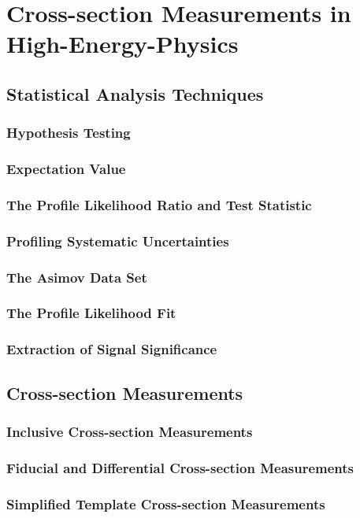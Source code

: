 \chapter{Cross-section Measurements in High-Energy-Physics}
\label{chap:statistics}

\section{Statistical Analysis Techniques}
\subsection{Hypothesis Testing}
\subsection{Expectation Value}
\subsection{The Profile Likelihood Ratio and Test Statistic}
\subsection{Profiling Systematic Uncertainties}
\subsection{The Asimov Data Set}
\subsection{The Profile Likelihood Fit}
\subsection{Extraction of Signal Significance}

\section{Cross-section Measurements}
\subsection{Inclusive Cross-section Measurements}
\subsection{Fiducial and Differential Cross-section Measurements}
\subsection{Simplified Template Cross-section Measurements}
